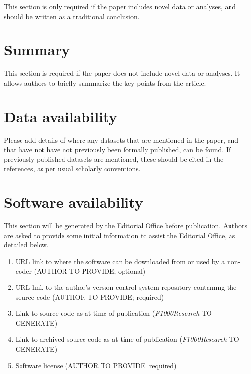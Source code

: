 \documentclass[9pt,a4paper,]{extarticle}
\begin{document}
This section is only required if the paper includes novel data or analyses, and should be written as a traditional conclusion.

\hypertarget{summary}{%
\section{Summary }\label{summary}}

This section is required if the paper does not include novel data or analyses. It allows authors to briefly summarize the key points from the article.

\hypertarget{data-availability}{%
\section{Data availability }\label{data-availability}}

Please add details of where any datasets that are mentioned in the paper, and that have not have not previously been formally published, can be found. If previously published datasets are mentioned, these should be cited in the references, as per usual scholarly conventions.

\hypertarget{software-availability}{%
\section{Software availability}\label{software-availability}}

This section will be generated by the Editorial Office before publication. Authors are asked to provide some initial information to assist the Editorial Office, as detailed below.

\begin{enumerate}
\def\labelenumi{\arabic{enumi}.}
\item
  URL link to where the software can be downloaded from or used by a non-coder (AUTHOR TO PROVIDE; optional)
\item
  URL link to the author's version control system repository containing the source code (AUTHOR TO PROVIDE; required)
\item
  Link to source code as at time of publication (\emph{F1000Research} TO GENERATE)
\item
  Link to archived source code as at time of publication (\emph{F1000Research} TO GENERATE)
\item
  Software license (AUTHOR TO PROVIDE; required)
\end{enumerate}
\end{document}
